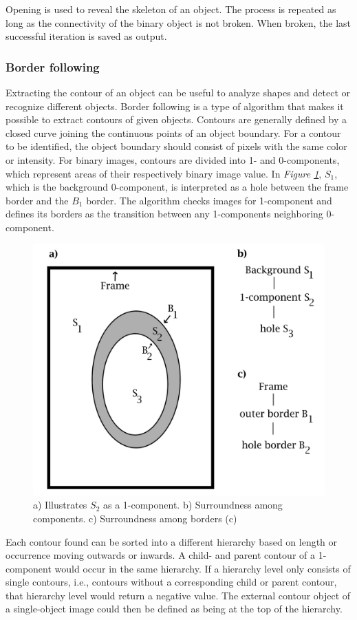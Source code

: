 \noindent Opening is used to reveal the skeleton of an object. The process is repeated as long as the connectivity of the binary object is not broken. When broken, the last successful iteration is saved as output.

\subsubsection{Border following}
Extracting the contour of an object can be useful to analyze shapes and detect or recognize different objects. Border following \cite{Suzuki} is a type of algorithm that makes it possible to extract contours of given objects. Contours are generally defined by a closed curve joining the continuous points of an object boundary. For a contour to be identified, the object boundary should consist of pixels with the same color or intensity. 
For binary images, contours are divided into 1- and 0-components, which represent areas of their respectively binary image value. In \textit{Figure \ref{fig:suzuki border}}, $S_{1}$, which is the background 0-component, is interpreted as a hole between the frame border and the $B_{1}$ border. The algorithm checks images for 1-component and defines its borders as the transition between any 1-components neighboring 0-component.

\begin{figure}[H]
    \centering
     \includegraphics[width=0.65\linewidth]{figures/PDF/Border_following.pdf}
    \caption{a) Illustrates $S_{2}$ as a  1-component. b) Surroundness among components. c) Surroundness among borders (c)}
    \label{fig:suzuki border}
\end{figure}

\noindent Each contour found can be sorted into a different hierarchy based on length or occurrence moving outwards or inwards. A  child- and parent contour of a 1-component would occur in the same hierarchy. If a hierarchy level only consists of single contours, i.e., contours without a corresponding child or parent contour, that hierarchy level would return a negative value.  The external contour object of a single-object image could then be defined as being at the top of the hierarchy.\\

